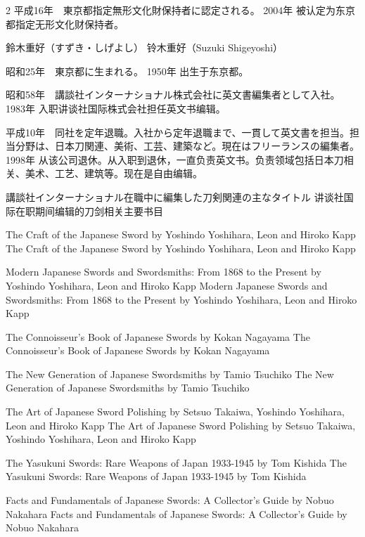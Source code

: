\documentclass[12pt,UTF8]{ctexbook}
\begin{document}
\begin{paracol}{2}
平成16年　東京都指定無形文化財保持者に認定される。
\switchcolumn*
2004年 被认定为东京都指定无形文化财保持者。
\switchcolumn*

鈴木重好（すずき・しげよし）
\switchcolumn*
铃木重好（Suzuki Shigeyoshi）
\switchcolumn*

昭和25年　東京都に生まれる。
\switchcolumn*
1950年 出生于东京都。
\switchcolumn*

昭和58年　講談社インターナショナル株式会社に英文書編集者として入社。
\switchcolumn*
1983年 入职讲谈社国际株式会社担任英文书编辑。
\switchcolumn*

平成10年　同社を定年退職。入社から定年退職まで、一貫して英文書を担当。担当分野は、日本刀関連、美術、工芸、建築など。現在はフリーランスの編集者。
\switchcolumn*
1998年 从该公司退休。从入职到退休，一直负责英文书。负责领域包括日本刀相关、美术、工艺、建筑等。现在是自由编辑。
\switchcolumn*

講談社インターナショナル在職中に編集した刀剣関連の主なタイトル
\switchcolumn*
讲谈社国际在职期间编辑的刀剑相关主要书目
\switchcolumn*

The Craft of the Japanese Sword by Yoshindo Yoshihara, Leon and Hiroko Kapp
\switchcolumn*
The Craft of the Japanese Sword by Yoshindo Yoshihara, Leon and Hiroko Kapp
\switchcolumn*

Modern Japanese Swords and Swordsmiths: From 1868 to the Present by Yoshindo Yoshihara, Leon and Hiroko Kapp
\switchcolumn*
Modern Japanese Swords and Swordsmiths: From 1868 to the Present by Yoshindo Yoshihara, Leon and Hiroko Kapp
\switchcolumn*

The Connoisseur's Book of Japanese Swords by Kokan Nagayama
\switchcolumn*
The Connoisseur's Book of Japanese Swords by Kokan Nagayama
\switchcolumn*

The New Generation of Japanese Swordsmiths by Tamio Tsuchiko
\switchcolumn*
The New Generation of Japanese Swordsmiths by Tamio Tsuchiko
\switchcolumn*

The Art of Japanese Sword Polishing by Setsuo Takaiwa, Yoshindo Yoshihara, Leon and Hiroko Kapp
\switchcolumn*
The Art of Japanese Sword Polishing by Setsuo Takaiwa, Yoshindo Yoshihara, Leon and Hiroko Kapp
\switchcolumn*

The Yasukuni Swords: Rare Weapons of Japan 1933-1945 by Tom Kishida
\switchcolumn*
The Yasukuni Swords: Rare Weapons of Japan 1933-1945 by Tom Kishida
\switchcolumn*

Facts and Fundamentals of Japanese Swords: A Collector's Guide by Nobuo Nakahara
\switchcolumn*
Facts and Fundamentals of Japanese Swords: A Collector's Guide by Nobuo Nakahara
\end{paracol}
\end{document}
